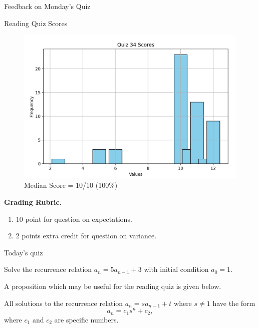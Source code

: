 \documentclass[10pt]{beamer}
\begin{document}
\begin{frame}[standout]
Feedback on Monday's Quiz
\end{frame}

\begin{frame}{Reading Quiz Scores}
\footnotesize 
\begin{figure}[ht]
        \centering
        \includegraphics[width=.7\textwidth]{images/reading_quiz_scores}
   		 \caption{Median Score = 10/10 (100\%)}
\end{figure}
\vfill 
\textbf{Grading Rubric.}  	
\begin{enumerate}
\item 10 point for question on expectations.
\item 2 points extra credit for question on variance.
\end{enumerate}

\end{frame}	


\begin{frame}[standout]
Today's quiz
\end{frame}

\begin{frame}
\begin{myredbox}[title=Reading Quiz (Recurrence Relations)]
Solve the recurrence relation $a_n = 5 a_{n-1} + 3$ with initial condition $a_0=1$.
\end{myredbox}
\vfill 

A proposition which may be useful for the reading quiz is given below.

\vfill

\begin{mygreenbox}[title=\text{Proposition 23.1 from Scheinerman}]
All solutions to the recurrence relation $a_n = s a_{n-1} + t$ where $s \neq 1$ have the form
\[a_n = c_1 s^n + c_2, \]
where $c_1$ and $c_2$ are specific numbers.
\end{mygreenbox} 

\end{frame}
\end{document}
